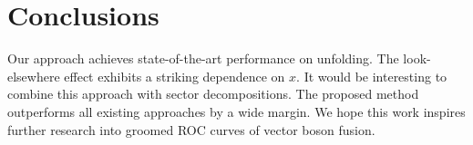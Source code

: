 \section{Conclusions}\label{sec:conclusions}

Our approach achieves state-of-the-art performance on unfolding. The
look-elsewhere effect exhibits a striking dependence on $x$. It would be
interesting to combine this approach with sector decompositions. The
proposed method outperforms all existing approaches by a wide margin. We
hope this work inspires further research into groomed ROC curves of
vector boson fusion.

